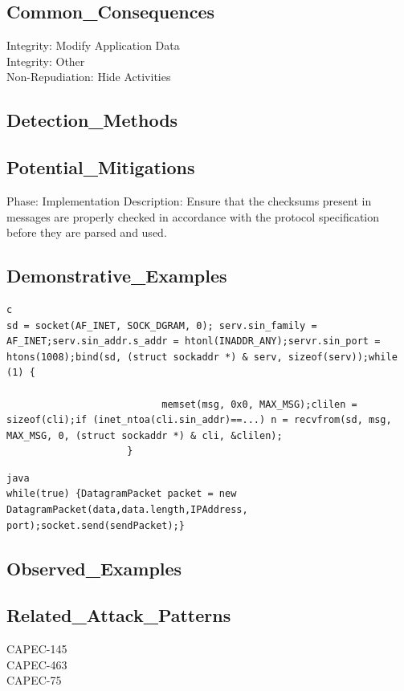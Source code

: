 \subsection*{Common\_Consequences}
Integrity: Modify Application Data\\
Integrity: Other\\
Non-Repudiation: Hide Activities\\
\subsection*{Detection\_Methods}
\subsection*{Potential\_Mitigations}
Phase: Implementation
Description: Ensure that the checksums present in messages are properly checked in accordance with the protocol specification before they are parsed and used.\\
\subsection*{Demonstrative\_Examples}
\begin{lstlisting}[breaklines=true,postbreak=\mbox{$\hookrightarrow$\space}]
c
sd = socket(AF_INET, SOCK_DGRAM, 0); serv.sin_family = AF_INET;serv.sin_addr.s_addr = htonl(INADDR_ANY);servr.sin_port = htons(1008);bind(sd, (struct sockaddr *) & serv, sizeof(serv));while (1) {
                        
                           memset(msg, 0x0, MAX_MSG);clilen = sizeof(cli);if (inet_ntoa(cli.sin_addr)==...) n = recvfrom(sd, msg, MAX_MSG, 0, (struct sockaddr *) & cli, &clilen);
                     }
\end{lstlisting}

\begin{lstlisting}[breaklines=true,postbreak=\mbox{$\hookrightarrow$\space}]
java
while(true) {DatagramPacket packet = new DatagramPacket(data,data.length,IPAddress, port);socket.send(sendPacket);}
\end{lstlisting}

\subsection*{Observed\_Examples}
\subsection*{Related\_Attack\_Patterns}
CAPEC-145\\
CAPEC-463\\
CAPEC-75\\
